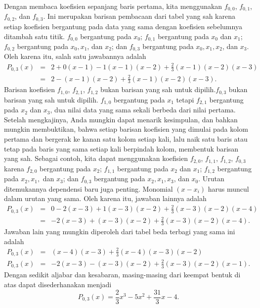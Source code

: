\begin{description}
Dengan membaca koefisien sepanjang baris pertama, kita menggunakan
$f_{0,0}$, $f_{0,1}$, $f_{0,2}$, dan $f_{0,3}$. Ini merupakan
barisan pembacaan dari tabel yang sah karena setiap koefisien bergantung
pada data yang sama dengan koefisien sebelumnya ditambah satu titik.
$f_{0,0}$ bergantung pada $x_{0}$; $f_{0,1}$ bergantung pada $x_{0}$
dan $x_{1}$; $f_{0,2}$ bergantung pada $x_{0},x_{1}$, dan $x_{2}$;
dan $f_{0,3}$ bergantung pada $x_{0},x_{1},x_{2}$, dan $x_{3}$.
Oleh karena itu, salah satu jawabannya adalah
\begin{eqnarray*}
P_{0,3}(x) & = & 2+0(x-1)-1(x-1)(x-2)+\frac{2}{3}(x-1)(x-2)(x-3)\\
 & = & 2-(x-1)(x-2)+\frac{2}{3}(x-1)(x-2)(x-3).
\end{eqnarray*}
Barisan koefisien $f_{1,0}$, $f_{2,1}$, $f_{1,2}$ bukan barisan
yang sah untuk dipilih.$f_{0,3}$ bukan barisan yang sah untuk dipilih.
$f_{1,0}$ bergantung pada $x_{1}$ tetapi $f_{2,1}$ bergantung pada
$x_{2}$ dan $x_{3}$, dua nilai data yang sama sekali berbeda dari
nilai pertama. Setelah mengkajinya, Anda mungkin dapat menarik kesimpulan,
dan bahkan mungkin membuktikan, bahwa setiap barisan koefisien yang
dimulai pada kolom pertama dan bergerak ke kanan satu kolom setiap
kali, lalu naik satu baris atau tetap pada baris yang sama setiap
kali berpindah kolom, membentuk barisan yang sah. Sebagai contoh,
kita dapat menggunakan koefisien $f_{2,0}$, $f_{1,1}$, $f_{1,2}$,
$f_{0,3}$ karena $f_{2,0}$ bergantung pada $x_{2}$; $f_{1,1}$
bergantung pada $x_{2}$ dan $x_{1}$; $f_{1,2}$ bergantung pada
$x_{2},x_{1},$ dan $x_{3}$; dan $f_{0,3}$ bergantung pada $x_{2},x_{1},x_{3}$,
dan $x_{0}$. Urutan ditemukannya dependensi baru juga penting. Monomial
$(x-x_{i})$ harus muncul dalam urutan yang sama. Oleh karena itu,
jawaban lainnya adalah
\begin{eqnarray*}
P_{0,3}(x) & = & 0-2(x-3)+1(x-3)(x-2)+\frac{2}{3}(x-3)(x-2)(x-4)\\
 & = & -2(x-3)+(x-3)(x-2)+\frac{2}{3}(x-3)(x-2)(x-4).
\end{eqnarray*}
Jawaban lain yang mungkin diperoleh dari tabel beda terbagi yang sama
ini adalah
\begin{eqnarray*}
P_{0,3}(x) & = & (x-4)(x-3)+\frac{2}{3}(x-4)(x-3)(x-2)\\
P_{0,3}(x) & = & -2(x-3)-(x-3)(x-2)+\frac{2}{3}(x-3)(x-2)(x-1).
\end{eqnarray*}
Dengan sedikit aljabar dan kesabaran, masing-masing dari keempat bentuk
di atas dapat disederhanakan menjadi
\[
P_{0,3}(x)=\frac{2}{3}x^{3}-5x^{2}+\frac{31}{3}x-4.
\]


\end{description}
